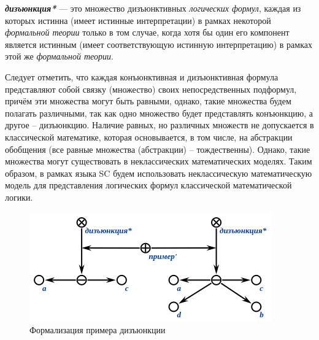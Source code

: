 
\begin{SCn}
\end{SCn}

\textbf{\textit{дизъюнкция*}} --- это множество дизъюнктивных \textit{логических формул}, каждая из которых истинна (имеет истинные интерпретации) в рамках некоторой \textit{формальной теории} только в том случае, когда хотя бы один его компонент является истинным (имеет соответствующую истинную интерпретацию) в рамках этой же \textit{формальной теории}.

Следует отметить, что каждая конъюнктивная и дизъюнктивная формула представляют собой связку (множество) своих непосредственных подформул, причём эти множества могут быть равными, однако, такие множества будем полагать различными, так как одно множество будет представлять конъюнкцию, а другое -- дизъюнкцию. Наличие равных, но различных множеств не допускается в классической математике, которая основывается, в том числе, на абстракции обобщения (все равные множества (абстракции) -- тождественны). Однако, такие множества могут существовать в неклассических математических моделях. Таким образом, в рамках языка SC будем использовать неклассическую математическую модель для представления логических формул классической математической логики.

\begin{figure}[H]
	\includegraphics[scale=0.8]{author/part2/figures/logic/disjunction.png}
	\caption{Формализация примера дизъюнкции}
	\label{fig:disjunction}
\end{figure}

